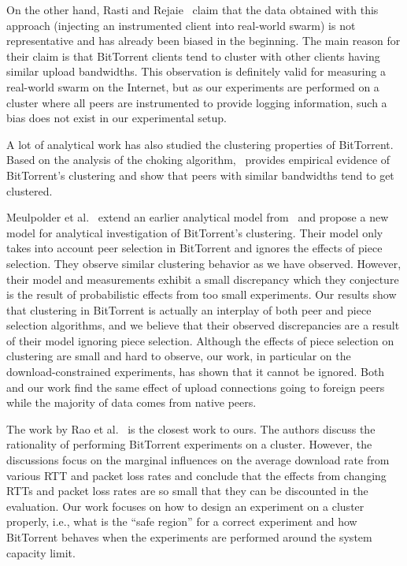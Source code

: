 \documentclass[10pt,letterpaper,twocolumn]{article}
\begin{document}
On the other hand, Rasti and Rejaie~\cite{ras07} claim that the data
obtained with this approach (injecting an instrumented client into
real-world swarm) is not representative and has already been biased in
the beginning. The main reason for their claim is that BitTorrent
clients tend to cluster with other clients having similar upload
bandwidths. This observation is definitely valid for measuring a
real-world swarm on the Internet, but as our experiments are performed
on a cluster where all peers are instrumented to provide logging
information, such a bias does not exist in our experimental setup.

A lot of analytical work has also studied the clustering properties of
BitTorrent. Based on the analysis of the choking
algorithm,~\cite{legout07} provides empirical evidence of BitTorrent's
clustering and show that peers with similar bandwidths tend to get
clustered. 

Meulpolder et al.~\cite{meu09} extend an earlier analytical model
from~\cite{qiu04} and propose a new model for analytical investigation
of BitTorrent's clustering. Their model only takes into account peer
selection in BitTorrent and ignores the effects of piece
selection. They observe similar clustering behavior as we have
observed. However, their model and measurements exhibit a small
discrepancy which they conjecture is the result of probabilistic
effects from too small experiments. Our results show that clustering
in BitTorrent is actually an interplay of both peer and piece
selection algorithms, and we believe that their observed discrepancies
are a result of their model ignoring piece selection. Although the
effects of piece selection on clustering are small and hard to
observe, our work, in particular on the download-constrained
experiments, has shown that it cannot be ignored. Both~\cite{meu09}
and our work find the same effect of upload connections going to
foreign peers while the majority of data comes from native peers.







The work by Rao et al.~\cite{rao10} is the closest work to ours. The
authors discuss the rationality of performing BitTorrent experiments
on a cluster. However, the discussions focus on the marginal
influences on the average download rate from various RTT and packet
loss rates and conclude that the effects from changing RTTs and packet
loss rates are so small that they can be discounted in the
evaluation. Our work focuses on how to design an experiment on a
cluster properly, i.e., what is the ``safe region'' for a correct
experiment and how BitTorrent behaves when the experiments are
performed around the system capacity limit.
\end{document}

